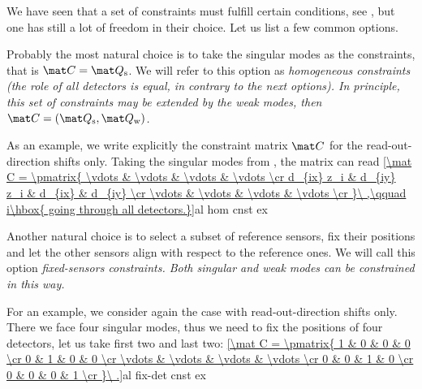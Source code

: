 We have seen that a set of constraints must fulfill certain conditions, see , but one has still a lot of freedom in their choice. Let us list a few common options.

\> Probably the most natural choice is to take the singular modes as the constraints, that is $\mat C = \mat Q_{\rm s}$. We will refer to this option as \em{homogeneous constraints} (the role of all detectors is equal, in contrary to the next options). In principle, this set of constraints may be extended by the weak modes, then $\mat C = (\mat Q_{\rm s}, \mat Q_{\rm w})$.
\par\parindent\itindent\indent\hang As an example, we write explicitly the constraint matrix $\mat C$ for the read-out-direction shifts only. Taking the singular modes from , the matrix can read
\eqref{\mat C = \pmatrix{
	\vdots		& \vdots		& \vdots	& \vdots \cr
	d_{ix} z_i	& d_{iy} z_i	& d_{ix}	& d_{iy} \cr
	\vdots		& \vdots		& \vdots	& \vdots \cr
}\ ,\qquad i\hbox{ going through all detectors.}}{al hom cnst ex}

\> Another natural choice is to select a subset of reference sensors, fix their positions and let the other sensors align with respect to the reference ones. We will call this option \em{fixed-sensors constraints}. Both singular and weak modes can be constrained in this way.
\par\parindent\itindent\indent\hang For an example, we consider again the case with read-out-direction shifts only. There we face four singular modes, thus we need to fix the positions of four detectors, let us take first two and last two:
\eqref{\mat C = \pmatrix{
	1		& 0			& 0 		& 0 		\cr
	0		& 1			& 0 		& 0 		\cr
	\vdots	& \vdots	& \vdots	& \vdots	\cr
	0		& 0			& 1 		& 0 		\cr
	0		& 0			& 0 		& 1 		\cr
}\ .}{al fix-det cnst ex}

